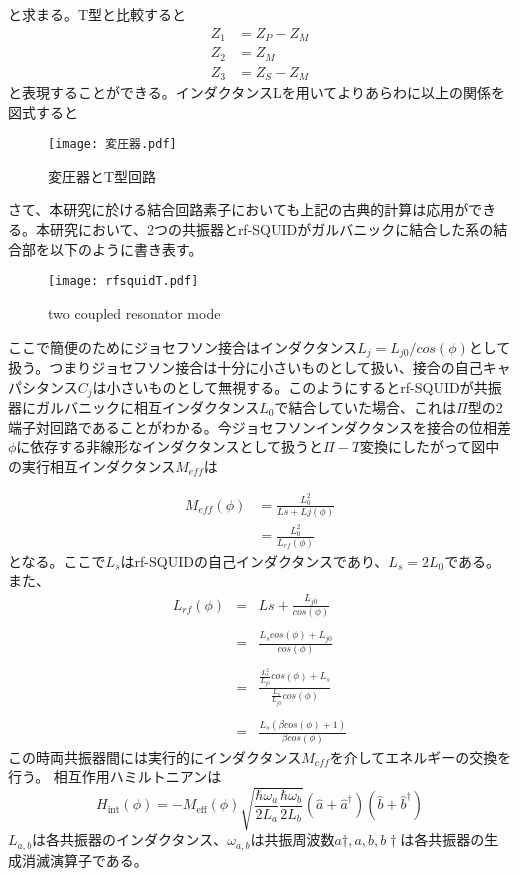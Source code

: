 と求まる。T型と比較すると
\begin{eqnarray}
    Z_1 &= Z_P-Z_M\\
    Z_2 &= Z_M\\
    Z_3 &= Z_S-Z_M
\end{eqnarray}
と表現することができる。インダクタンスLを用いてよりあらわに以上の関係を図式すると
\begin{figure}[H]
    \centering
    \texttt{[image: 変圧器.pdf]}
    \caption{変圧器とT型回路}
\end{figure}
さて、本研究に於ける結合回路素子においても上記の古典的計算は応用ができる\cite*{Tian_2008}。本研究において、2つの共振器とrf-SQUIDがガルバニックに結合した系の結合部を以下のように書き表す。
\begin{figure}[H]
    \centering
    \texttt{[image: rfsquidT.pdf]}
    \caption{two coupled resonator mode}
\end{figure}
ここで簡便のためにジョセフソン接合はインダクタンス$L_j = L_{j0}/cos(\phi)$として扱う。つまりジョセフソン接合は十分に小さいものとして扱い、接合の自己キャパシタンス$C_j$は小さいものとして無視する。このようにするとrf-SQUIDが共振器にガルバニックに相互インダクタンス$L_0$で結合していた場合、これは$\Pi$型の2端子対回路であることがわかる。今ジョセフソンインダクタンスを接合の位相差$\phi$に依存する非線形なインダクタンスとして扱うと$\Pi-T$変換にしたがって図中の実行相互インダクタンス$M_{eff}$は

\begin{eqnarray}
    M_{eff}(\phi) & = \frac{L_0^2}{Ls+Lj(\phi)}\\
    & =\frac{L_0^2}{L_{rf}(\phi)}
\end{eqnarray}
となる。ここで$L_s$はrf-SQUIDの自己インダクタンスであり、$L_s = 2 L_0$である。
また、
\begin{eqnarray}
    L_{rf}(\phi)  &=& Ls+\frac{L_{j0}}{cos(\phi)}\\ \\
    &=& \frac{L_s cos(\phi)+L_{j0}}{cos(\phi)}\\ \\
    &=& \frac{\frac{L_s^2}{L_{j0}} cos(\phi)+L_s}{\frac{L_s}{L_{j0}}cos(\phi)}\\ \\
    &=& \frac{L_s(\beta cos(\phi)+1)}{\beta cos(\phi)}
\end{eqnarray}
この時両共振器間には実行的にインダクタンス$M_{eff}$を介してエネルギーの交換を行う。
相互作用ハミルトニアンは
\begin{equation}
    H_{\mathrm{int}}(\phi)=-M_{\mathrm{eff}}(\phi) \sqrt{\frac{\hbar \omega_{a}}{2 L_{a}} \frac{\hbar \omega_{b}}{2 L_{b}}}\left(\hat{a}+\hat{a}^{\dagger}\right)\left(\hat{b}+\hat{b}^{\dagger}\right)
\end{equation}
$L_{a,b}$は各共振器のインダクタンス、$\omega_{a,b}$は共振周波数$a\dagger,a,b,b\dagger$は各共振器の生成消滅演算子である。